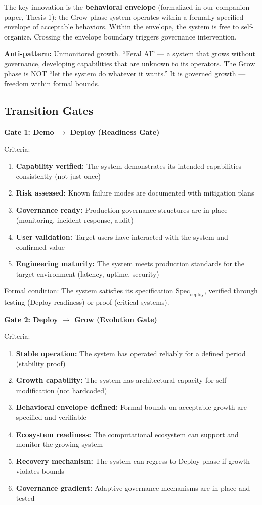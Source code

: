 \documentclass[11pt,a4paper]{article}
\begin{document}
The key innovation is the \textbf{behavioral envelope} (formalized in our companion paper, Thesis 1): the Grow phase system operates within a formally specified envelope of acceptable behaviors. Within the envelope, the system is free to self-organize. Crossing the envelope boundary triggers governance intervention.

\textbf{Anti-pattern:} Unmonitored growth. ``Feral AI'' --- a system that grows without governance, developing capabilities that are unknown to its operators. The Grow phase is NOT ``let the system do whatever it wants.'' It is governed growth --- freedom within formal bounds.

\subsection{Transition Gates}

\textbf{Gate 1: Demo $\rightarrow$ Deploy (Readiness Gate)}

\noindent Criteria:
\begin{enumerate}[nosep]
    \item \textbf{Capability verified:} The system demonstrates its intended capabilities consistently (not just once)
    \item \textbf{Risk assessed:} Known failure modes are documented with mitigation plans
    \item \textbf{Governance ready:} Production governance structures are in place (monitoring, incident response, audit)
    \item \textbf{User validation:} Target users have interacted with the system and confirmed value
    \item \textbf{Engineering maturity:} The system meets production standards for the target environment (latency, uptime, security)
\end{enumerate}

\noindent Formal condition: The system satisfies its specification $\mathrm{Spec}_{\mathrm{deploy}}$, verified through testing (Deploy readiness) or proof (critical systems).

\textbf{Gate 2: Deploy $\rightarrow$ Grow (Evolution Gate)}

\noindent Criteria:
\begin{enumerate}[nosep]
    \item \textbf{Stable operation:} The system has operated reliably for a defined period (stability proof)
    \item \textbf{Growth capability:} The system has architectural capacity for self-modification (not hardcoded)
    \item \textbf{Behavioral envelope defined:} Formal bounds on acceptable growth are specified and verifiable
    \item \textbf{Ecosystem readiness:} The computational ecosystem can support and monitor the growing system
    \item \textbf{Recovery mechanism:} The system can regress to Deploy phase if growth violates bounds
    \item \textbf{Governance gradient:} Adaptive governance mechanisms are in place and tested
\end{enumerate}
\end{document}
